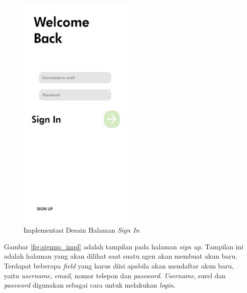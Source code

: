\begin{figure} [!ht]
  \centering
  \includegraphics[width=0.5\textwidth]{gambar/signin.jpg}
  \caption{Implementasi Desain Halaman \textit{Sign In}}
  \label{fig:login_impl}
\end{figure}

Gambar \ref{fig:signup_impl} adalah tampilan pada halaman \textit{sign up}. Tampilan ini adalah halaman yang akan dilihat saat suatu agen akan membuat akun baru. Terdapat beberapa \textit{field} yang harus diisi apabila akan mendaftar akun baru, yaitu \textit{username}, \textit{email}, nomor telepon dan \textit{password}. \textit{Username}, surel dan \textit{password} digunakan sebagai cara untuk melakukan \textit{login}.


